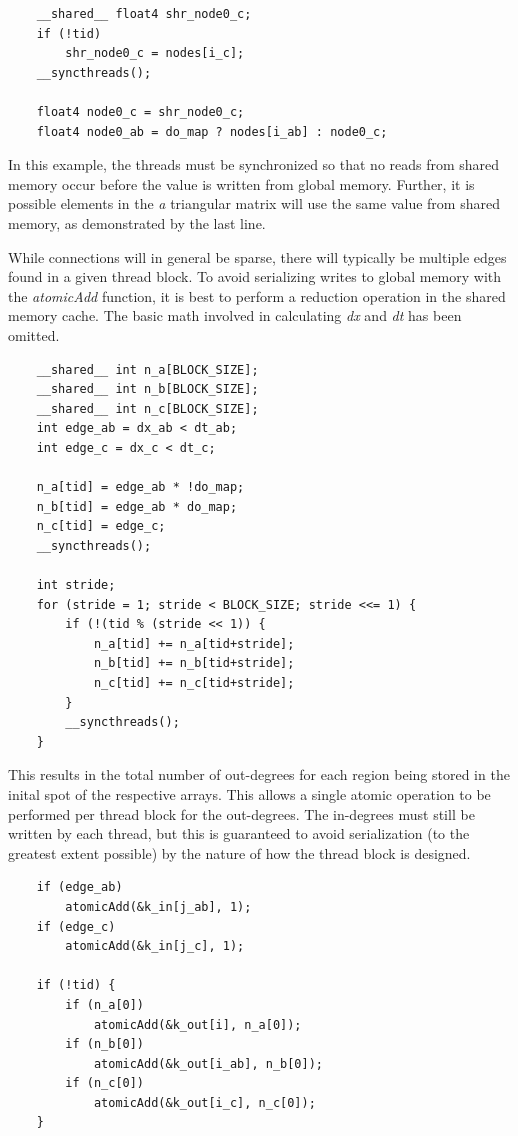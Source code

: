\documentclass[preprint,notitlepage,amsmath,amssymb,floatfix]{revtex4-1}
\begin{document}
\begin{lstlisting}
	__shared__ float4 shr_node0_c;
	if (!tid)
		shr_node0_c = nodes[i_c];
	__syncthreads();

	float4 node0_c = shr_node0_c;
	float4 node0_ab = do_map ? nodes[i_ab] : node0_c;
\end{lstlisting}

\noindent In this example, the threads must be synchronized so that no reads from shared memory occur before the value is written from global memory.  
Further, it is possible elements in the \textit{a} triangular matrix will use the same value from shared memory, as demonstrated by the last line. \par
While connections will in general be sparse, there will typically be multiple edges found in a given thread block.  
To avoid serializing writes to global memory with the \textit{atomicAdd} function, it is best to perform a reduction operation in the shared memory cache.  
The basic math involved in calculating \textit{dx} and \textit{dt} has been omitted.

\begin{lstlisting}
	__shared__ int n_a[BLOCK_SIZE];
	__shared__ int n_b[BLOCK_SIZE];
	__shared__ int n_c[BLOCK_SIZE];
	int edge_ab = dx_ab < dt_ab;
	int edge_c = dx_c < dt_c;

	n_a[tid] = edge_ab * !do_map;
	n_b[tid] = edge_ab * do_map;
	n_c[tid] = edge_c;
	__syncthreads();

	int stride;
	for (stride = 1; stride < BLOCK_SIZE; stride <<= 1) {
		if (!(tid % (stride << 1)) {
			n_a[tid] += n_a[tid+stride];
			n_b[tid] += n_b[tid+stride];
			n_c[tid] += n_c[tid+stride];
		}
		__syncthreads();
	}
\end{lstlisting}

\noindent This results in the total number of out-degrees for each region being stored in the inital spot of the respective arrays.  
This allows a single atomic operation to be performed per thread block for the out-degrees.  
The in-degrees must still be written by each thread, but this is guaranteed to avoid serialization (to the greatest extent possible) by the nature of how the thread block is designed.

\begin{lstlisting}
	if (edge_ab)
		atomicAdd(&k_in[j_ab], 1);
	if (edge_c)
		atomicAdd(&k_in[j_c], 1);

	if (!tid) {
		if (n_a[0])
			atomicAdd(&k_out[i], n_a[0]);
		if (n_b[0])
			atomicAdd(&k_out[i_ab], n_b[0]);
		if (n_c[0])
			atomicAdd(&k_out[i_c], n_c[0]);
	}
\end{lstlisting}
\end{document}
